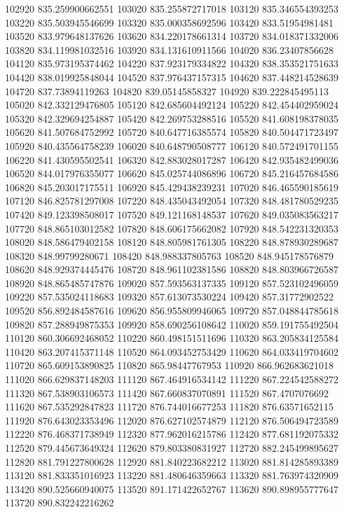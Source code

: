 {102920 835.259900662551
103020 835.255872717018
103120 835.346554393253
103220 835.503945546699
103320 835.000358692596
103420 833.51954981481
103520 833.979648137626
103620 834.220178661314
103720 834.018371332006
103820 834.119981032516
103920 834.131610911566
104020 836.23407856628
104120 835.973195374462
104220 837.923179334822
104320 838.353521751633
104420 838.019925848044
104520 837.976437157315
104620 837.448214528639
104720 837.73894119263
104820 839.05145858327
104920 839.222845495113
105020 842.332129476805
105120 842.685604492124
105220 842.454402959024
105320 842.329694254887
105420 842.269753288516
105520 841.608198378035
105620 841.507684752992
105720 840.647716385574
105820 840.504471723497
105920 840.435564758239
106020 840.648790508777
106120 840.572491701155
106220 841.430595502541
106320 842.883028017287
106420 842.935482499036
106520 844.017976355077
106620 845.025744086896
106720 845.216457684586
106820 845.203017175511
106920 845.429438239231
107020 846.465590185619
107120 846.825781297008
107220 848.435043492054
107320 848.481780529235
107420 849.123398508017
107520 849.121168148537
107620 849.035083563217
107720 848.865103012582
107820 848.606175662082
107920 848.542231320353
108020 848.586479402158
108120 848.805981761305
108220 848.878930289687
108320 848.99799280671
108420 848.988337805763
108520 848.945178576879
108620 848.929374445476
108720 848.961102381586
108820 848.803966726587
108920 848.865485747876
109020 857.593563137335
109120 857.523102496059
109220 857.535024118683
109320 857.613073530224
109420 857.31772902522
109520 856.892484587616
109620 856.955809946065
109720 857.048844785618
109820 857.288949875353
109920 858.690256108642
110020 859.191755492504
110120 860.306692468052
110220 860.498151511696
110320 863.205834125584
110420 863.207415371148
110520 864.093452753429
110620 864.033419704602
110720 865.609153890825
110820 865.98447767953
110920 866.962683621018
111020 866.629837148203
111120 867.464916534142
111220 867.224542588272
111320 867.538903106573
111420 867.660837070891
111520 867.4707076692
111620 867.535292847823
111720 876.744016677253
111820 876.63571652115
111920 876.643023353496
112020 876.627102574879
112120 876.506494723589
112220 876.468371738949
112320 877.962016215786
112420 877.681192075332
112520 879.445673649324
112620 879.803380831927
112720 882.245499895627
112820 881.791227800628
112920 881.840223682212
113020 881.814285893389
113120 881.833351016923
113220 881.480646359663
113320 881.763974320909
113420 890.525660940075
113520 891.171422652767
113620 890.898955777647
113720 890.832242216262
}
